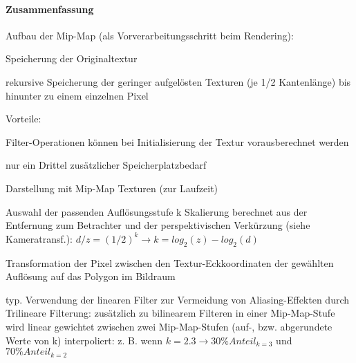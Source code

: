 \documentclass[landscape]{article}
\begin{document}
\begin{multicols}{3}
  \paragraph{Zusammenfassung}
  Aufbau der Mip-Map (als Vorverarbeitungsschritt beim Rendering):
  \begin{itemize*}
    \item Speicherung der Originaltextur
    \item rekursive Speicherung der geringer aufgelösten Texturen (je 1/2 Kantenlänge) bis hinunter zu einem einzelnen Pixel
  \end{itemize*}
  
  Vorteile:
  \begin{itemize*}
    \item Filter-Operationen können bei Initialisierung der Textur vorausberechnet werden
    \item nur ein Drittel zusätzlicher Speicherplatzbedarf
  \end{itemize*}
  
  Darstellung mit Mip-Map Texturen (zur Laufzeit)
  \begin{itemize*}
    \item Auswahl der passenden Auflösungsstufe k Skalierung berechnet aus der Entfernung zum Betrachter und der perspektivischen Verkürzung (siehe Kameratransf.): $d/z = (1/2)^k \rightarrow k = log_2(z)-log_2(d)$
    \item Transformation der Pixel zwischen den Textur-Eckkoordinaten der gewählten Auflösung auf das Polygon im Bildraum
    \item typ. Verwendung der linearen Filter zur Vermeidung von Aliasing-Effekten durch Trilineare Filterung: zusätzlich zu bilinearem Filteren in einer Mip-Map-Stufe wird linear gewichtet zwischen zwei Mip-Map-Stufen (auf-, bzw. abgerundete Werte von k) interpoliert: z. B. wenn $k = 2.3 \rightarrow 30\% Anteil_{k=3}$ und $70\% Anteil_{k=2}$
  \end{itemize*}
  
  

\end{multicols}
\end{document}
